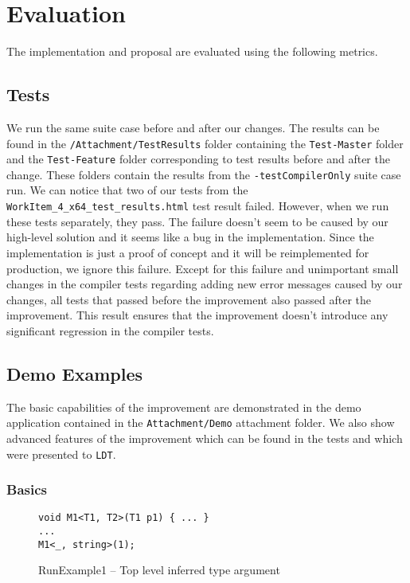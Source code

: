 \chapter{Evaluation}

The implementation and proposal are evaluated using the following metrics.

\section{Tests}

We run the same suite case before and after our changes. 
The results can be found in the \texttt{/Attachment/TestResults} folder containing the \texttt{Test-Master} folder and the \texttt{Test-Feature} folder corresponding to test results before and after the change. 
These folders contain the results from the \texttt{-testCompilerOnly} suite case run.
We can notice that two of our tests from the \texttt{WorkItem\_4\_x64\_test\_results.html} test result failed.
However, when we run these tests separately, they pass.
The failure doesn't seem to be caused by our high-level solution and it seems like a bug in the implementation.
Since the implementation is just a proof of concept and it will be reimplemented for production, we ignore this failure.
Except for this failure and unimportant small changes in the compiler tests regarding adding new error messages caused by our changes, all tests that passed before the improvement also passed after the improvement.
This result ensures that the improvement doesn’t introduce any significant regression in the compiler tests.

\section{Demo Examples}

The basic capabilities of the improvement are demonstrated in the demo application contained in the \texttt{Attachment/Demo} attachment folder. 
We also show advanced features of the improvement which can be found in the tests and which were presented to \texttt{LDT}. 


\subsection{Basics}

\begin{figure}[h]
\begin{lstlisting}[style=csharp, showstringspaces=false]
void M1<T1, T2>(T1 p1) { ... }
...
M1<_, string>(1);
\end{lstlisting}
\caption{RunExample1 -- Top level inferred type argument}
\label{img100:example1}
\end{figure}


